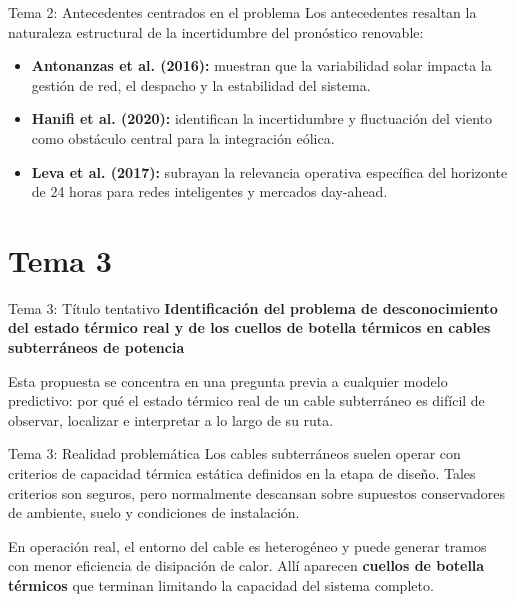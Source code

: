 \documentclass[aspectratio=169]{beamer}
\begin{document}
\begin{frame}{Tema 2: Antecedentes centrados en el problema}
\justifying
Los antecedentes resaltan la naturaleza estructural de la incertidumbre del pronóstico renovable:
\begin{itemize}[leftmargin=*]
    \item \textbf{Antonanzas et al. (2016):} muestran que la variabilidad solar impacta la gestión de red, el despacho y la estabilidad del sistema.
    \item \textbf{Hanifi et al. (2020):} identifican la incertidumbre y fluctuación del viento como obstáculo central para la integración eólica.
    \item \textbf{Leva et al. (2017):} subrayan la relevancia operativa específica del horizonte de 24 horas para redes inteligentes y mercados day-ahead.
\end{itemize}
\end{frame}

\section{Tema 3}

\begin{frame}{Tema 3: Título tentativo}
\textbf{{\Large Identificación del problema de desconocimiento del estado térmico real y de los cuellos de botella térmicos en cables subterráneos de potencia}}

\vspace{0.8em}
\justifying
Esta propuesta se concentra en una pregunta previa a cualquier modelo predictivo: por qué el estado térmico real de un cable subterráneo es difícil de observar, localizar e interpretar a lo largo de su ruta.
\end{frame}

\begin{frame}{Tema 3: Realidad problemática}
\justifying
Los cables subterráneos suelen operar con criterios de capacidad térmica estática definidos en la etapa de diseño. Tales criterios son seguros, pero normalmente descansan sobre supuestos conservadores de ambiente, suelo y condiciones de instalación.

\vspace{0.5em}
En operación real, el entorno del cable es heterogéneo y puede generar tramos con menor eficiencia de disipación de calor. Allí aparecen \textbf{cuellos de botella térmicos} que terminan limitando la capacidad del sistema completo.
\end{frame}
\end{document}
